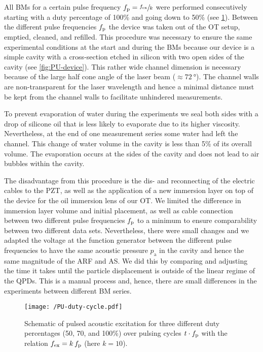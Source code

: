 All BMs for a certain pulse frequency $f_{\mathrm{p}}=\sfrac{f_{\mathrm{ex}}}{k}$ were performed 
consecutively starting with a duty percentage of 100\% and going down to 50\% 
(see \cref{fig:PU-duty_cycle}). Between the different pulse frequencies $f_{\mathrm{p}}$ the 
device was taken out of the OT setup, emptied, cleaned, and refilled. This 
procedure was necessary to ensure the same experimental conditions at the start 
and during the BMs because our device is a simple cavity with a 
 cross-section etched 
in silicon with two open sides of the cavity (see \cref{fig:PU-device}). This 
rather wide channel dimension is necessary because of the large half cone angle 
of the laser beam ($\approx \SI{72}{\degree}$). The channel walls are 
non-transparent for the laser wavelength and hence a minimal distance must be 
kept from the channel walls to facilitate unhindered measurements.

To prevent evaporation of water during the experiments we seal both sides with 
a drop of silicone oil that is less likely to evaporate due to its higher 
viscosity. Nevertheless, at the end of one measurement series some water had 
left the channel. This change of water volume in the cavity is less than 5\% of 
its overall volume. The evaporation occurs at the sides of the cavity and does 
not lead to air bubbles within the cavity.

The disadvantage from this procedure is the dis- and reconnecting of the 
electric cables to the PZT, as well as the application of a new immersion layer 
on top of the device for the oil immersion lens of our OT. We limited the 
difference in immersion layer volume and initial placement, as well as cable 
connection between two different pulse frequencies $f_{\mathrm{p}}$ to a minimum to ensure 
comparability between two different data sets. Nevertheless, there were small 
changes and we adapted the voltage at the function generator between the 
different pulse frequencies to have the same acoustic pressure $p_{\mathrm{a}}$ 
in the cavity and hence the same magnitude of the ARF and AS. We did this by 
comparing and adjusting the time it takes until the particle displacement is 
outside of the linear regime of the QPDs. This is a manual process and, hence, 
there are small differences in the experiments between different BM series.


\begin{figure}[tbp]
  \centering
  \texttt{[image: /PU-duty-cycle.pdf]}
  \caption{Schematic of pulsed acoustic excitation for three different duty 
      percentages (50, 70, and 100\%) over pulsing cycles $t\cdot f_{\mathrm{p}}$ with the 
      relation $f_{\mathrm{ex}}=k\,f_{\mathrm{p}}$ (here $k=10$).
  }\label{fig:PU-duty_cycle}
\end{figure}

